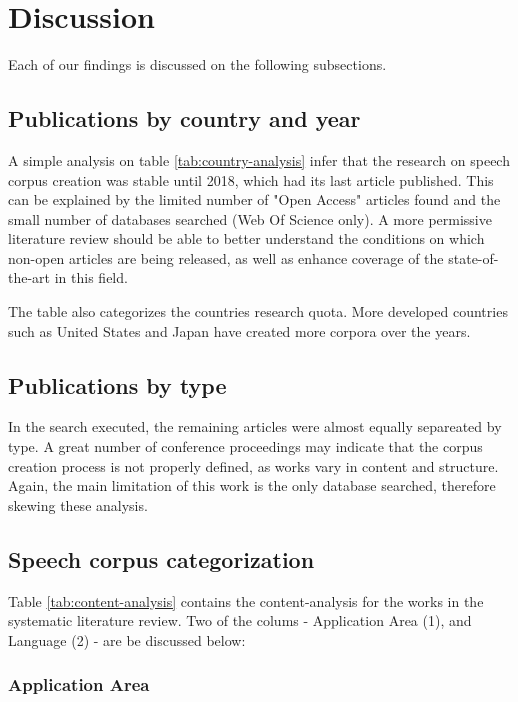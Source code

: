 \documentclass[conference]{IEEEtran}
\begin{document}
\section{Discussion}
\label{sec:discussion}

Each of our findings is discussed on the following subsections.

\subsection{Publications by country and year}

A simple analysis on table \ref{tab:country-analysis} infer that the research on speech corpus creation was stable until 2018, which had its last article published. This can be explained by the limited number of "Open Access" articles found and the small number of databases searched (Web Of Science only). A more permissive literature review should be able to better understand the conditions on which non-open articles are being released, as well as enhance coverage of the state-of-the-art in this field.

The table also categorizes the countries research quota. More developed countries such as United States and Japan have created more corpora over the years.

\subsection{Publications by type}

In the search executed, the remaining articles were almost equally separeated by type. A great number of conference proceedings may indicate that the corpus creation process is not properly defined, as works vary in content and structure. Again, the main limitation of this work is the only database searched, therefore skewing these analysis.

\subsection{Speech corpus categorization}

Table \ref{tab:content-analysis} contains the content-analysis for the works in the systematic literature review. Two of the colums - Application Area (1), and Language (2) - are be discussed below:

\subsubsection{Application Area}
\end{document}
